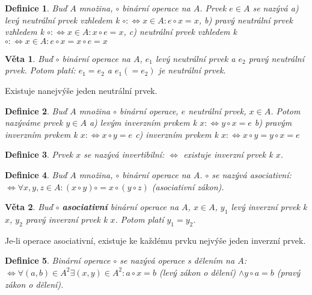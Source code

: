 \documentclass[a4paper, 11pt]{report}
\newtheorem{mydef}{Definice}[chapter]
\newtheorem{veta}{Věta}[chapter]
\begin{document}
\begin{mydef}
Buď $A$ množina, $\circ$ binární operace na $A$. Prvek $e \in A$ se nazývá
a) \emph{levý neutrální prvek} vzhledem k $\circ: \Leftrightarrow x \in A : e \circ x = x$,
b) \emph{pravý neutrální prvek} vzhledem k $\circ: \Leftrightarrow x \in A : x \circ e = x$,
c) \emph{neutrální prvek} vzhledem k $\circ: \Leftrightarrow x \in A : e \circ x = x \circ e = x$
\end{mydef}

\begin{veta}
Buď $\circ$ binární operace na $A$, $e_1$ levý neutrální prvek a $e_2$ pravý neutrální prvek. Potom platí: $e_1 = e_2$ a $e_1 (= e_2)$ je neutrální prvek.
\end{veta}
Existuje nanejvýše jeden neutrální prvek.

\begin{mydef}
Buď $A$ množina $\circ$ binární operace, $e$ neutrální prvek, $x \in A$. Potom nazýváme prvek $y \in A$
a) \emph{levým inverzním prvkem} k $x: \Leftrightarrow y \circ x = e$
b) \emph{pravým inverzním prvkem} k $x: \Leftrightarrow x \circ y = e$
c) \emph{inverzním prvkem} k $x: \Leftrightarrow x \circ y = y \circ x = e$
\end{mydef}

\begin{mydef}
Prvek $x$ se nazývá invertibilní: $\Leftrightarrow$ existuje inverzní prvek k $x$.
\end{mydef}

\begin{mydef}
Buď $A$ množina, $\circ$ binární operace na $A$. $\circ$ se nazývá \emph{asociativní}: $\Leftrightarrow \forall x,y,z \in A: (x \circ y) \circ = x \circ (y \circ z)$ (asociativní zákon). 
\end{mydef}

\begin{veta}
Buď $\circ$ \textbf{asociativní} binární operace na $A$, $x \in A$, $y_1$ levý inverzní prvek k $x$, $y_2$ pravý inverzní prvek k $x$. Potom platí $y_1 = y_2$.
\end{veta}

Je-li operace asociativní, existuje ke každému prvku nejvýše jeden inverzní prvek.

\begin{mydef}
Binární operace $\circ$ se nazývá operace s dělením na $A$: $\Leftrightarrow \forall (a,b) \in A^2 \exists (x,y) \in A^2: a \circ x = b$ (levý zákon o dělení) $\land y \circ a = b$ (pravý zákon o dělení).
\end{mydef}
\end{document}
